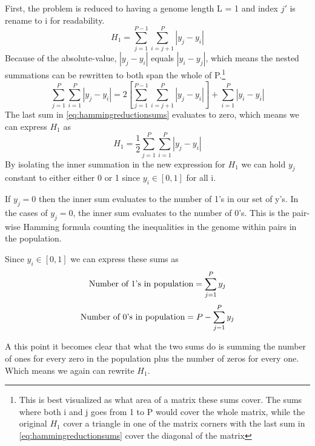 First, the problem is reduced to having a genome length L = 1 and index \({j}'\) is rename to i for readability.
\begin{equation*}
    H_{1}=\sum_{j=1}^{P-1}\sum_{i=j+1}^{P}\left |y_{j}-y_{i}\right |
\end{equation*}
Because of the absolute-value, \(\left |y_{j}-y_{i}\right |\) equals \(\left |y_{i}-y_{j}\right |\), which means the nested summations can be rewritten to both span the whole of P.\footnote{This is best visualized as what area of a matrix these sums cover. The sums where both i and j goes from 1 to P would cover the whole matrix, while the original \(H_{1}\) cover a triangle in one of the matrix corners with the last sum in \ref{eq:hammingreductionsums} cover the diagonal of the matrix}
\begin{equation}
    \label{eq:hammingreductionsums}
    \sum_{j=1}^{P}\sum_{i=1}^{P}\left | y_{j}-y_{i} \right | = 2\left [ \sum_{j=1}^{P-1}\sum_{i=j+1}^{P}\left | y_{j}-y_{i} \right | \right ]+ \sum_{i=1}^{P}\left | y_{i}-y_{i} \right | 
\end{equation}
The last sum in \ref{eq:hammingreductionsums} evaluates to zero, which means we can express \(H_{1}\) as 
\begin{equation*}
    H_{1} = \frac{1}{2}\sum_{j=1}^{P}\sum_{i=1}^{P}\left | y_{j}-y_{i} \right |
\end{equation*}
By isolating the inner summation in the new expression for \(H_{1}\) we can hold \(y_{j}\) constant to either either 0 or 1 since \(y_{i}\in\left [0, 1\right]\) for all i.

If \(y_{j}=0\) then the inner sum evaluates to the number of 1's in our set of y's. 
In the cases of \(y_{j}=0\), the inner sum evaluates to the number of 0's. This is the pair-wise Hamming formula counting the inequalities in the genome within pairs in the population.

Since \(y_{i}\in\left [0, 1\right]\) we can express these sums as
\begin{equation*}
    \textnormal{Number of 1's in population} = \sum_{j=1}^{P}y_{j} 
\end{equation*}
\begin{equation*}
    \textnormal{Number of 0's in population} = P-\sum_{j=1}^{P}y_{j}
\end{equation*}

A this point it becomes clear that what the two sums do is summing the number of ones for every zero in the population plus the number of zeros for every one. Which means we again can rewrite \(H_{1}\). 

